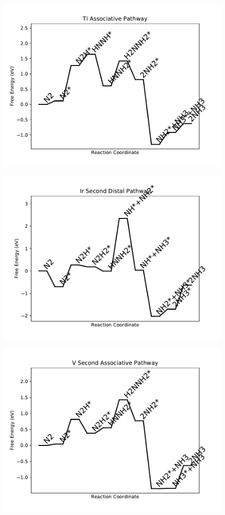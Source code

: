 \begin{figure}
\includegraphics[width=0.8\linewidth]{data/plots/Ti_associative.pdf}
\end{figure}

\begin{figure}
\includegraphics[width=0.8\linewidth]{data/plots/Ir_distal_2.pdf}
\end{figure}

\begin{figure}
\includegraphics[width=0.8\linewidth]{data/plots/V_associative_2.pdf}
\end{figure}

